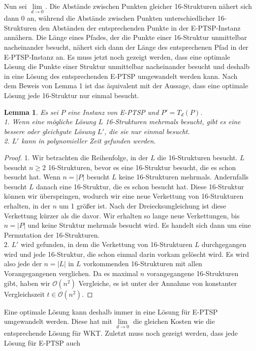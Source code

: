 \documentclass[a4paper,10pt,ngerman]{scrartcl}
\newtheorem{lemma}[theorem]{Lemma}
\begin{document}
Nun sei $\lim \limits_{d \to 0}$. Die Abstände zwischen Punkten gleicher 16-Strukturen
nähert sich dann $0$ an, während die Abstände zwischen Punkten unterschiedlicher 16-Strukturen den Abständen
der entsprechenden Punkte in der E-PTSP-Instanz annähern. Die Länge eines Pfades, der die Punkte einer
16-Struktur unmittelbar nacheinander besucht, nähert sich dann der Länge des entsprechenen Pfad in der E-PTSP-Instanz an.
Es muss jetzt noch gezeigt werden, dass eine optimale Lösung die Punkte einer Struktur unmittelbar nacheinander
besucht und deshalb in eine Lösung des entsprechenden E-PTSP umgewandelt werden kann. Nach dem Beweis von
Lemma 1 ist das äquivalent mit der Aussage, dass eine optimale Lösung jede 16-Struktur nur einmal besucht.
\begin{lemma}
  Es sei $P$ eine Instanz von E-PTSP und $P'=T_d(P)$. \\
  1.
  Wenn eine mögliche Lösung $L$ 16-Strukturen mehrmals besucht,
  gibt es eine bessere oder gleichgute Lösung $L'$, die sie nur einmal besucht. \\
  2.
  $L'$ kann in polynomieller Zeit gefunden werden.
\end{lemma}
\begin{proof}
  1.
  Wir betrachten die Reihenfolge, in der $L$ die 16-Strukturen besucht. $L$ besucht $n \geq 2$ 16-Strukturen, bevor
  es eine 16-Struktur besucht, die es schon besucht hat. Wenn $n=|P|$ besucht $L$ keine 16-Strukturen mehrmals.
  Andernfalls besucht $L$ danach eine 16-Struktur, die es schon besucht hat. Diese 16-Struktur können wir überspringen,
  wodurch wir eine neue Verkettung von 16-Strukturen erhalten, in der $n$ um 1 größer ist. Nach der Dreiecksungleichung
  ist diese Verkettung kürzer als die davor. Wir erhalten so lange neue Verkettungen, bis $n=|P|$ und keine Struktur mehrmals
  besucht wird. Es handelt sich dann um eine Permutation der 16-Strukturen.\\
  2. $L'$ wird gefunden, in dem die Verkettung von 16-Strukturen $L$ durchgegangen wird und jede 16-Struktur,
  die schon einmal darin vorkam gelöscht wird. Es wird also jede der $n=|L|$ in $L$ vorkommenden
  16-Strukturen mit allen Vorangegangenen verglichen. Da es maximal $n$ vorangegangene 16-Strukturen gibt,
  haben wir $\mathcal{O}(n^2)$ Vergleiche, es ist unter der Annahme von konstanter Vergleichszeit $t \in \mathcal{O}(n^2)$.
\end{proof}
Eine optimale Lösung kann deshalb immer in eine Lösung für E-PTSP umgewandelt werden. Diese hat mit $\lim \limits_{d \to 0}$
die gleichen Kosten wie die entsprechende Lösung für WKT. Zuletzt muss noch gezeigt werden, dass jede Lösung für E-PTSP auch
\end{document}
